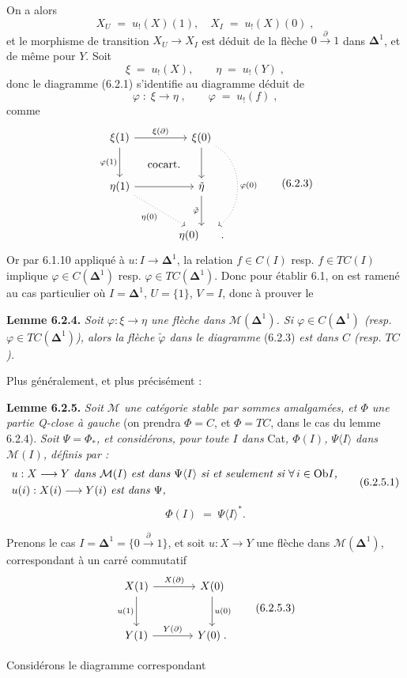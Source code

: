 \documentclass[11pt]{article}
\newcommand{\printedpage}[1]{\marginpar{\footnotesize p.~#1}}
\newcommand{\msp}[1]{\marginpar{\footnotesize [#1]}}
\newcommand{\Dl}{\boldsymbol{\Delta}}
\newcommand{\Ob}{\mathrm{Ob}}
\begin{document}
\msp{page 106}
On a alors
\[
X_U \;=\; u_!(X)(1), \quad X_I \;=\; u_!(X)(0)\;,
\]
et le morphisme de transition $X_U \longrightarrow X_I$ est déduit de la flèche $0 \xrightarrow{\ \partial\ } 1$ dans $\Dl^1$, et de même pour $Y$. Soit
\[
\xi \;=\; u_!(X), \qquad \eta \;=\; u_!(Y)\;,
\]
\printedpage{53}
donc le diagramme (6.2.1) s'identifie au diagramme déduit de
\[
\varphi \;:\; \xi \longrightarrow \eta\;, \qquad \varphi \;=\; u_!(f)\;,
\]
comme
\[
\begin{tikzcd}[row sep=large, column sep=large]
\xi(1) \arrow[r, "\xi(\partial)"] \arrow[d, "\varphi(1)"'] \arrow[dr, phantom, "\text{cocart.}"] & \xi(0) \arrow[d] \arrow[dd, dotted, bend left=60, "\varphi(0)"] \\
\eta(1) \arrow[r] \arrow[dr, dotted, "\eta(0)"'] & \tilde{\eta} \arrow[d, "\tilde{\varphi}"'] \\
 & \eta(0) \qquad .
\end{tikzcd}
\tag*{(6.2.3)}
\]
Or par 6.1.10 appliqué à $u : I \longrightarrow \Dl^1$, la relation $f \in C(I)$ resp. $f \in TC(I)$ implique $\varphi \in C(\Dl^1)$ resp. $\varphi \in TC(\Dl^1)$. Donc pour établir 6.1, on est ramené au cas particulier où $I = \Dl^1$, $U = \{1\}$, $V = I$, donc à prouver le

\textbf{Lemme 6.2.4.} \textit{Soit $\varphi : \xi \longrightarrow \eta$ une flèche dans $\mathcal{M}(\Dl^1)$. Si $\varphi \in C(\Dl^1)$ (resp.}
\msp{page 107}
\textit{$\varphi \in TC(\Dl^1)$), alors la flèche $\tilde{\varphi}$ dans le diagramme} (6.2.3) \textit{est dans $C$ (resp. $TC$).}

Plus généralement, et plus précisément :

\textbf{Lemme 6.2.5.} \textit{Soit $\mathcal{M}$ une catégorie stable par sommes amalgamées, et $\Phi$ une partie Q-close à gauche} (on prendra $\Phi = C$, et $\Phi = TC$, dans le cas du lemme 6.2.4). \textit{Soit $\Psi = \Phi_{*}$, et considérons, pour toute $I$ dans} Cat\textit{, $\Phi(I)$, $\Psi\langle I\rangle$ dans $\mathcal{M}(I)$, définis par :}
\[
\begin{aligned}
&\text{\textit{$u : X \longrightarrow Y$ dans $\mathcal{M}(I)$ est dans $\Psi\langle I\rangle$ si et seulement si $\forall\, i \in \Ob I$,}}\\
&\text{\textit{$u(i) : X(i) \longrightarrow Y(i)$ est dans $\Psi$,}}
\end{aligned}
\tag*{(6.2.5.1)}
\]
\[
\Phi(I) \;=\; \Psi\langle I\rangle^{*}.
\tag*{(6.2.5.2)}
\]

Prenons le cas $I = \Dl^1 = \{0 \xrightarrow{\ \partial\ } 1\}$, et soit $u : X \longrightarrow Y$ une flèche dans $\mathcal{M}(\Dl^1)$, correspondant à un carré commutatif
\[
\begin{tikzcd}[row sep=large, column sep=large]
X(1) \arrow[r, "X(\partial)"] \arrow[d, "u(1)"'] & X(0) \arrow[d, "u(0)"] \\
Y(1) \arrow[r, "Y(\partial)"] & Y(0)\;.
\end{tikzcd}
\tag*{(6.2.5.3)}
\]

Considérons le diagramme correspondant
\end{document}
